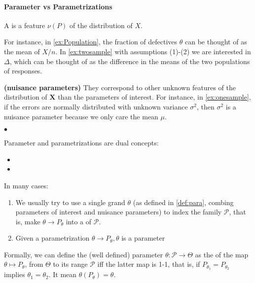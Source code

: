 \documentclass{article}
\newcommand{\bfs}[1]{\textbf{({#1}) }}
\begin{document}
\paragraph{Parameter vs Parametrizations}
\begin{defa}\label{def:para}
 A  is a feature $\nu(P)$ of the distribution of $X$.
\end{defa} 
\begin{exma}
For instance, in \cref{ex:Population}, the fraction of defectives $\theta$ can be thought of as the mean of $X / n$. In \cref{ex:twosample} with assumptions (1)-(2) we are interested in $\Delta$, which can be thought of as the difference in the means of the two populations of responses. 
\end{exma}
\begin{exma}\bfs{nuisance parameters}
They correspond to other unknown features of the distribution of $\mathbf{X}$ than the parameters of interest. For instance, in \cref{ex:onesample}, if the errors are normally distributed with unknown variance $\sigma^{2}$, then $\sigma^{2}$ is a nuisance parameter because we only care the mean $\mu$. 
\end{exma}
$\bullet$ 

Parameter and parametrizations are dual concepts:
\begin{itemize}
    \item {}
    \item {}
\end{itemize}
In many cases:
\begin{enumerate}
    \item We usually try to use a single grand  $\theta$ (as defined in \cref{def:para}, combing parameters of interest and nuisance parameters) to index the family $\mathcal{P}$, that is, make $\theta \rightarrow P_{\theta}$ into a  of $\mathcal{P}$.
    \item Given a parametrization $\theta \rightarrow P_{\theta}, \theta$ is a parameter  
\end{enumerate}




 Formally, we can define the (well defined) parameter $\theta: \mathcal{P} \rightarrow \Theta$ as the  of the map $\theta \mapsto P_{\theta}$, from $\Theta$ to its range $\mathcal{P}$ iff the latter map is 1-1, that is, if $P_{\theta_{1}}=P_{\theta_{2}}$ implies $\theta_{1}=\theta_{2}$. It mean $\theta\left(P_{\theta}\right)=\theta$.
\end{document}
